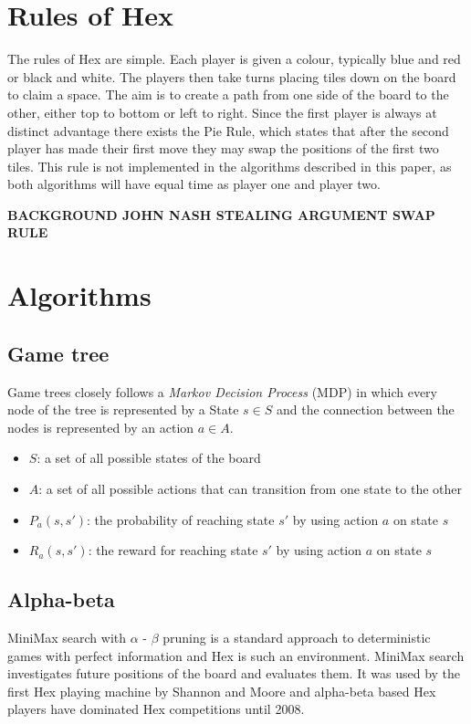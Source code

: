 \documentclass{ba-kecs}
\begin{document}
\section{Rules of Hex}
The rules of Hex are simple. Each player is given a colour, typically blue and red or black and white. The players then take turns placing tiles down on the board to claim a space. The aim is to create a path from one side of the board to the other, either top to bottom or left to right. Since the first player is always at distinct advantage there exists the Pie Rule, which states that after the second player has made their first move they may swap the positions of the first two tiles. This rule is not implemented in the algorithms described in this paper, as both algorithms will have equal time as player one and player two.

\textbf{BACKGROUND JOHN NASH STEALING ARGUMENT SWAP RULE} \cite{nash1952}

\section{Algorithms}
\subsection{Game tree}
Game trees closely follows a \textit{Markov Decision Process} (MDP) in which every node of the tree is represented by a State $s \in S$ and the connection between the nodes is represented by an action $a \in A$. \cite{browne2012survey}
\begin{itemize}
	\item $S$: a set of all possible states of the board
	\item $A$: a set of all possible actions that can transition from one state to the other
	\item $P_a(s, s')$: the probability of reaching state $s'$ by using action $a$ on state $s$
	\item $R_a(s, s')$: the reward for reaching state $s'$ by using action $a$ on state $s$
\end{itemize}
\subsection{Alpha-beta}
MiniMax search with $\alpha$ - $\beta$ pruning is a standard approach to deterministic games with perfect information and Hex is such an environment. MiniMax search investigates future positions of the board and evaluates them. It was used by the first Hex playing machine by Shannon and Moore \cite{shannon1953computers} and alpha-beta based Hex players have dominated Hex competitions until 2008.\cite{arneson2010monte} 
\end{document}

